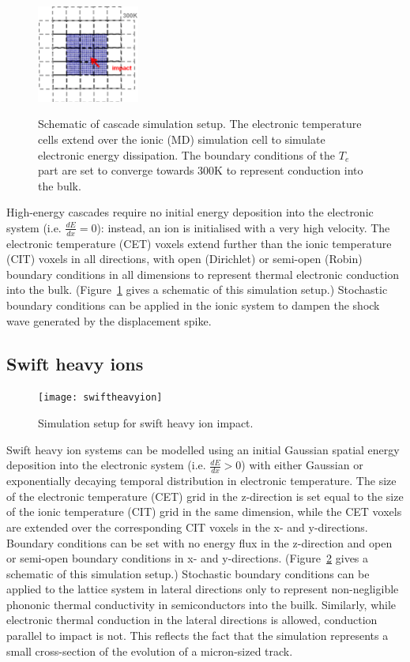 \begin{figure}[h] 
	\centering
	{
		\includegraphics[width=0.3\textwidth]{cascades}
	}
	\caption{Schematic of cascade simulation setup. The electronic temperature cells extend over the ionic (MD) simulation cell to simulate electronic energy dissipation. The boundary conditions of the $T_e$ part are set to converge towards 300K to represent conduction into the bulk.}
	\label{fig:cascades}
\end{figure}
High-energy cascades require no initial energy deposition into the 
electronic system (i.e. $\frac{dE}{dx} = 0$): instead, an ion is 
initialised with a very high velocity. The electronic temperature 
(CET) voxels extend further than the ionic temperature (CIT) 
voxels in all directions, with open (Dirichlet) or semi-open 
(Robin) boundary conditions in all dimensions to represent thermal 
electronic conduction into the bulk. (Figure~\ref{fig:cascades} gives 
a schematic of this simulation setup.) Stochastic boundary 
conditions can be applied in the ionic system to dampen the shock 
wave generated by the displacement spike.

\subsection*{Swift heavy ions}

\begin{figure}[h] 
	\centering
	{
		\texttt{[image: swiftheavyion]}
	}
	\caption{Simulation setup for swift heavy ion impact.}
	\label{fig:SHI}
\end{figure}
Swift heavy ion systems can be modelled using an initial Gaussian 
spatial energy deposition into the electronic system (i.e. 
$\frac{dE}{dx} > 0$) with either Gaussian or exponentially decaying 
temporal distribution in electronic temperature. The size of the 
electronic temperature (CET) grid in the z-direction is set equal to 
the size of the ionic temperature (CIT) grid in the same dimension, 
while the CET voxels are extended over the corresponding CIT 
voxels in the x- and y-directions. Boundary conditions can be set 
with no energy flux in the z-direction and open or semi-open 
boundary conditions in x- and y-directions. (Figure~\ref{fig:SHI} 
gives a schematic of this simulation setup.) Stochastic boundary 
conditions can be applied to the lattice system in lateral directions 
only to represent non-negligible phononic thermal conductivity 
in semiconductors into the builk. Similarly, while electronic thermal 
conduction in the lateral directions is allowed, conduction parallel to 
impact is not. This reflects the fact that the simulation represents a 
small cross-section of the evolution of a micron-sized track.

